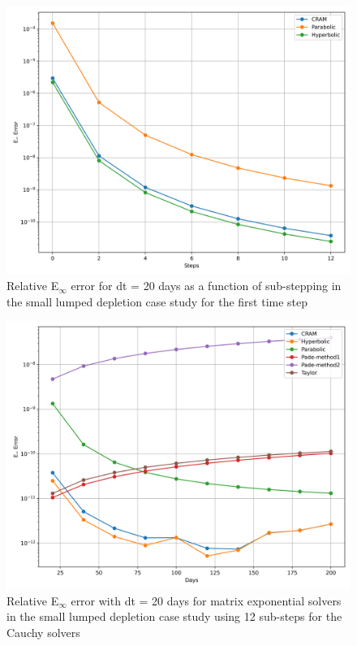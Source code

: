\begin{figure}[p]
    \centering
    \includegraphics[width=5in]{images/chapter-5/caseStudies/smallLumpedDepletion/msrSmallLumpedDepletionEinfErrorerrorWithSteps.png}
    \caption{Relative E$_{\infty}$ error for dt = 20 days as a function of sub-stepping in the small lumped depletion case study for the first time step}
    \label{fig:small_lumped_depletion_Einf_with_substeps}
\end{figure}

\clearpage

\begin{figure}[p]
    \centering
    \includegraphics[width=5in]{images/chapter-5/caseStudies/smallLumpedDepletion/msrSmallLumpDepletionEinfErrorerrorSteps12.png}
    \caption{Relative E$_{\infty}$ error with dt = 20 days for matrix exponential solvers in the small lumped depletion case study using 12 sub-steps for the Cauchy solvers}
    \label{fig:small_lumped_depletion_Einf_steps12}
\end{figure}


